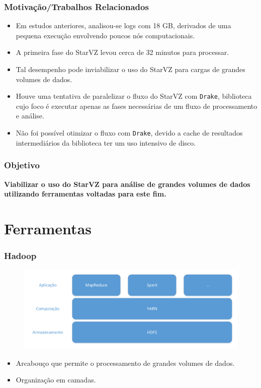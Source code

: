 \documentclass{beamer}
\begin{document}
\begin{frame}
\frametitle{Motivação/Trabalhos Relacionados}
  \begin{itemize}
   \item Em estudos anteriores, analisou-se logs com 18 GB, derivados de uma 
pequena execução envolvendo poucos nós computacionais.
   \item A primeira fase do StarVZ levou cerca de 32 minutos para processar.
   \item Tal desempenho pode inviabilizar o uso do StarVZ para cargas de 
grandes volumes de dados.
   \item Houve uma tentativa de paralelizar o fluxo do StarVZ com 
\texttt{Drake}, biblioteca cujo foco é executar apenas as fases necessárias de 
um fluxo de processamento e análise.
  \item Não foi possível otimizar o fluxo com \texttt{Drake}, devido a cache de 
resultados intermediários da biblioteca ter um uso intensivo de disco.
  \end{itemize}
\end{frame}

\begin{frame}
 \frametitle{Objetivo}
\textbf{Viabilizar o uso do StarVZ para análise de grandes volumes de dados 
utilizando ferramentas voltadas para este fim.}
\end{frame}


\section{Ferramentas}

\begin{frame}
 \frametitle{Hadoop}
 \begin{figure}[H]
  \centerline{\includegraphics[width=1\textwidth]{./img/hadoop-layers.pdf}}
  \label{fig:hadoop}
 \end{figure}
  \begin{itemize}
  \item Arcabouço que permite o processamento de grandes volumes de dados.
  \item Organização em camadas.
  \end{itemize}
\end{frame}
\end{document}
